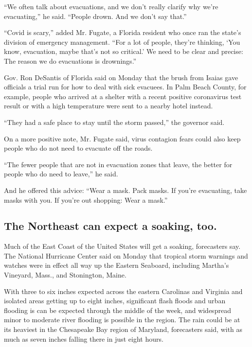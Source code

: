 ``We often talk about evacuations, and we don't really clarify why we're
evacuating,'' he said. ``People drown. And we don't say that.''

``Covid is scary,'' added Mr. Fugate, a Florida resident who once ran
the state's division of emergency management. ``For a lot of people,
they're thinking, `You know, evacuation, maybe that's not so critical.'
We need to be clear and precise: The reason we do evacuations is
drownings.''

Gov. Ron DeSantis of Florida said on Monday that the brush from Isaias
gave officials a trial run for how to deal with sick evacuees. In Palm
Beach County, for example, people who arrived at a shelter with a recent
positive coronavirus test result or with a high temperature were sent to
a nearby hotel instead.

``They had a safe place to stay until the storm passed,'' the governor
said.

On a more positive note, Mr. Fugate said, virus contagion fears could
also keep people who do not need to evacuate off the roads.

``The fewer people that are not in evacuation zones that leave, the
better for people who do need to leave,'' he said.

And he offered this advice: ``Wear a mask. Pack masks. If you're
evacuating, take masks with you. If you're out shopping: Wear a mask.''

\hypertarget{the-northeast-can-expect-a-soaking-too}{%
\subsection{The Northeast can expect a soaking,
too.}\label{the-northeast-can-expect-a-soaking-too}}

Much of the East Coast of the United States will get a soaking,
forecasters say. The National Hurricane Center said on Monday that
tropical storm warnings and watches were in effect all way up the
Eastern Seaboard, including Martha's Vineyard, Mass., and Stonington,
Maine.

With three to six inches expected across the eastern Carolinas and
Virginia and isolated areas getting up to eight inches, significant
flash floods and urban flooding is can be expected through the middle of
the week, and widespread minor to moderate river flooding is possible in
the region. The rain could be at its heaviest in the Chesapeake Bay
region of Maryland, forecasters said, with as much as seven inches
falling there in just eight hours.

